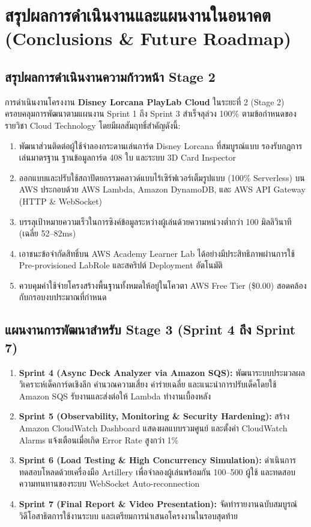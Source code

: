 \documentclass[12pt,a4paper]{report}
\begin{document}
\chapter{สรุปผลการดำเนินงานและแผนงานในอนาคต (Conclusions \& Future Roadmap)}

\section{สรุปผลการดำเนินงานความก้าวหน้า Stage 2}
การดำเนินงานโครงงาน \textbf{Disney Lorcana PlayLab Cloud} ในระยะที่ 2 (Stage 2) ครอบคลุมการพัฒนาตามแผนงาน Sprint 1 ถึง Sprint 3 สำเร็จลุล่วง 100\% ตามข้อกำหนดของรายวิชา Cloud Technology โดยมีผลสัมฤทธิ์สำคัญดังนี้:
\begin{enumerate}
    \item พัฒนาส่วนติดต่อผู้ใช้จำลองกระดานเล่นการ์ด Disney Lorcana ที่สมบูรณ์แบบ รองรับกฎการเล่นมาตรฐาน ฐานข้อมูลการ์ด 408 ใบ และระบบ 3D Card Inspector
    \item ออกแบบและปรับใช้สถาปัตยกรรมคลาวด์แบบไร้เซิร์ฟเวอร์เต็มรูปแบบ (100\% Serverless) บน AWS ประกอบด้วย AWS Lambda, Amazon DynamoDB, และ AWS API Gateway (HTTP \& WebSocket)
    \item บรรลุเป้าหมายความเร็วในการซิงค์ข้อมูลระหว่างผู้เล่นด้วยความหน่วงต่ำกว่า 100 มิลลิวินาที (เฉลี่ย 52--82ms)
    \item เอาชนะข้อจำกัดสิทธิ์บน AWS Academy Learner Lab ได้อย่างมีประสิทธิภาพผ่านการใช้ Pre-provisioned LabRole และสคริปต์ Deployment อัตโนมัติ
    \item ควบคุมค่าใช้จ่ายโครงสร้างพื้นฐานทั้งหมดให้อยู่ในโควตา AWS Free Tier (\$0.00) สอดคล้องกับกรอบงบประมาณที่กำหนด
\end{enumerate}

\section{แผนงานการพัฒนาสำหรับ Stage 3 (Sprint 4 ถึง Sprint 7)}
\begin{enumerate}
    \item \textbf{Sprint 4 (Async Deck Analyzer via Amazon SQS):} พัฒนาระบบประมวลผลวิเคราะห์เด็คการ์ดเชิงลึก คำนวณความเสี่ยง ค่าร่ายเฉลี่ย และแนะนำการปรับเด็คโดยใช้ Amazon SQS รับงานและส่งต่อให้ Lambda ทำงานเบื้องหลัง
    \item \textbf{Sprint 5 (Observability, Monitoring \& Security Hardening):} สร้าง Amazon CloudWatch Dashboard แสดงผลแบบรวมศูนย์ และตั้งค่า CloudWatch Alarms แจ้งเตือนเมื่อเกิด Error Rate สูงกว่า 1\%
    \item \textbf{Sprint 6 (Load Testing \& High Concurrency Simulation):} ดำเนินการทดสอบโหลดด้วยเครื่องมือ Artillery เพื่อจำลองผู้เล่นพร้อมกัน 100--500 ผู้ใช้ และทดสอบความทนทานของระบบ WebSocket Auto-reconnection
    \item \textbf{Sprint 7 (Final Report \& Video Presentation):} จัดทำรายงานฉบับสมบูรณ์ วิดีโอสาธิตการใช้งานระบบ และเตรียมการนำเสนอโครงงานในรอบสุดท้าย
\end{enumerate}
\end{document}
